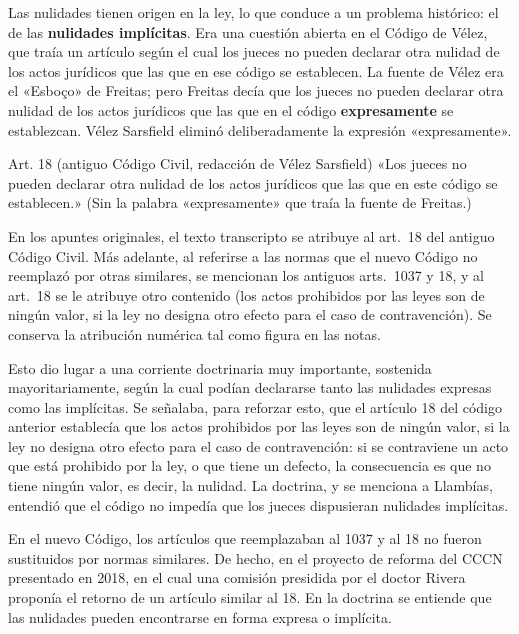 \documentclass[12pt,oneside]{book}
\begin{document}
Las nulidades tienen origen en la ley, lo que conduce a un problema histórico: el de las \textbf{nulidades implícitas}. Era una cuestión abierta en el Código de Vélez, que traía un artículo según el cual los jueces no pueden declarar otra nulidad de los actos jurídicos que las que en ese código se establecen. La fuente de Vélez era el «Esboço» de Freitas; pero Freitas decía que los jueces no pueden declarar otra nulidad de los actos jurídicos que las que en el código \textbf{expresamente} se establezcan. Vélez Sarsfield eliminó deliberadamente la expresión «expresamente».

\begin{articulo}{Art. 18 (antiguo Código Civil, redacción de Vélez Sarsfield)}
«Los jueces no pueden declarar otra nulidad de los actos jurídicos que las que en este código se establecen.» (Sin la palabra «expresamente» que traía la fuente de Freitas.)
\end{articulo}

\begin{note}
En los apuntes originales, el texto transcripto se atribuye al art.~18 del antiguo Código Civil. Más adelante, al referirse a las normas que el nuevo Código no reemplazó por otras similares, se mencionan los antiguos arts.~1037 y 18, y al art.~18 se le atribuye otro contenido (los actos prohibidos por las leyes son de ningún valor, si la ley no designa otro efecto para el caso de contravención). Se conserva la atribución numérica tal como figura en las notas.
\end{note}

Esto dio lugar a una corriente doctrinaria muy importante, sostenida mayoritariamente, según la cual podían declararse tanto las nulidades expresas como las implícitas. Se señalaba, para reforzar esto, que el artículo 18 del código anterior establecía que los actos prohibidos por las leyes son de ningún valor, si la ley no designa otro efecto para el caso de contravención: si se contraviene un acto que está prohibido por la ley, o que tiene un defecto, la consecuencia es que no tiene ningún valor, es decir, la nulidad. La doctrina, y se menciona a Llambías, entendió que el código no impedía que los jueces dispusieran nulidades implícitas.

En el nuevo Código, los artículos que reemplazaban al 1037 y al 18 no fueron sustituidos por normas similares. De hecho, en el proyecto de reforma del CCCN presentado en 2018, en el cual una comisión presidida por el doctor Rivera proponía el retorno de un artículo similar al 18. En la doctrina se entiende que las nulidades pueden encontrarse en forma expresa o implícita.
\end{document}

